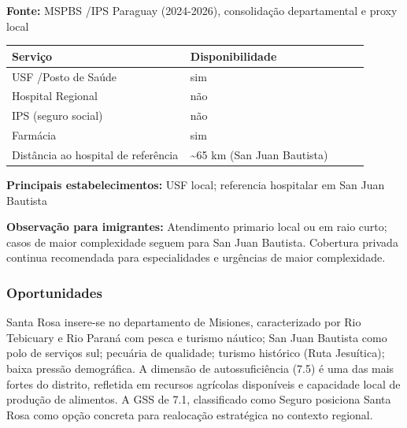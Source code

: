 \textbf{Fonte:} MSPBS /\allowbreak  IPS Paraguay (2024-2026), consolidação
departamental e proxy local

{\def\LTcaptype{none} %
\begin{longtable}{@{}>{\raggedright\arraybackslash}p{0.45\linewidth} >{\raggedright\arraybackslash}p{0.45\linewidth}@{}}
\toprule\noalign{}
Serviço & Disponibilidade \\
\midrule\noalign{}
\endhead
\bottomrule\noalign{}
\endlastfoot
USF /\allowbreak  Posto de Saúde & sim \\
Hospital Regional & não \\
IPS (seguro social) & não \\
Farmácia & sim \\
Distância ao hospital de referência & \textasciitilde65 km (San Juan
Bautista) \\
\end{longtable}
}

\textbf{Principais estabelecimentos:} USF local; referencia hospitalar
em San Juan Bautista

\textbf{Observação para imigrantes:} Atendimento primario local ou em
raio curto; casos de maior complexidade seguem para San Juan Bautista.
Cobertura privada continua recomendada para especialidades e urgências
de maior complexidade.
\newpage

\subsubsection*{Oportunidades}\label{oport-santa-rosa-0807}
Santa Rosa insere-se no departamento de Misiones, caracterizado por Rio Tebicuary e Rio Paraná com pesca e turismo náutico; San Juan Bautista como polo de serviços sul; pecuária de qualidade; turismo histórico (Ruta Jesuítica); baixa pressão demográfica. A dimensão de autossuficiência (7.5) é uma das mais fortes do distrito, refletida em recursos agrícolas disponíveis e capacidade local de produção de alimentos. A GSS de 7.1, classificado como Seguro posiciona Santa Rosa como opção concreta para realocação estratégica no contexto regional.

